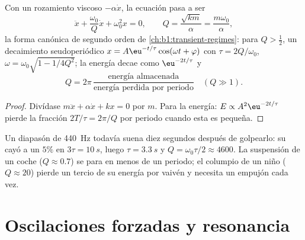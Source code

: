\begin{proposition}\label{prop:b1:oscillators-resonance:damped}
Con un rozamiento viscoso $-\alpha\dot x$, la ecuación pasa a ser
\[
\ddot x + \frac{\omega_0}{Q}\dot x + \omega_0^2x = 0, \qquad
Q = \frac{\sqrt{km}}{\alpha} = \frac{m\omega_0}{\alpha},
\]
la forma canónica de segundo orden de \cref{ch:b1:transient-regimes}: para
$Q > \tfrac12$, un decaimiento seudoperiódico $x = A\eu^{-t/\tau}\cos(\omega t +
\varphi)$ con $\tau = 2Q/\omega_0$, $\omega = \omega_0\sqrt{1 - 1/4Q^2}$; la
energía decae como $\eu^{-2t/\tau}$ y
\[
Q = 2\pi\,\frac{\text{energía almacenada}}{\text{energía perdida por periodo}}
\quad (Q \gg 1) .
\]
\end{proposition}

\begin{proof}
Divídase $m\ddot x + \alpha\dot x + kx = 0$ por $m$. Para la energía: $E
\propto A^2\eu^{-2t/\tau}$ pierde la fracción $2T/\tau = 2\pi/Q$ por
periodo cuando esta es pequeña.
\end{proof}

\begin{example}\label{ex:b1:oscillators-resonance:ringing}
Un diapasón de \qty{440}{Hz} todavía suena diez segundos después de
golpearlo: su  cayó a un $5\%$ en $3\tau = \qty{10}{s}$, luego
$\tau = \qty{3.3}{s}$ y $Q = \omega_0\tau/2 \approx 4600$. La suspensión de
un coche ($Q \approx 0.7$) se para en menos de un periodo; el columpio de
un niño ($Q \approx 20$) pierde un tercio de su energía por vaivén y
necesita un empujón cada vez.
\end{example}

\section{Oscilaciones forzadas y resonancia}

